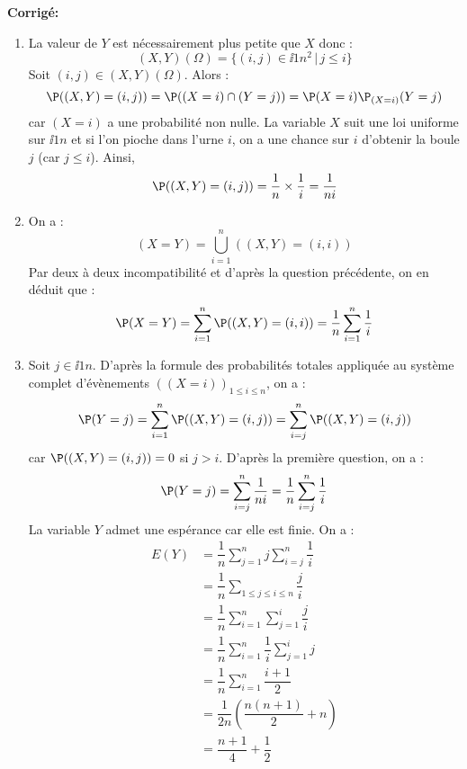 \documentclass[a4paper,twoside,french,11pt]{VcCours}
\newcommand{\corr}{\textbf{Corrigé:}}
\begin{document}
\corr

\begin{enumerate}
\item La valeur de $Y$ est nécessairement plus petite que $X$ donc :
$$ (X,Y)(\Omega) = \lbrace (i,j) \in \ii{1}{n}^2 \, \vert \, j \leq i \rbrace$$
Soit $(i,j) \in (X,Y)(\Omega)$. Alors :
$$ \P((X,Y)=(i,j)) = \P((X=i) \cap (Y=j)) = \P(X=i) \P_{(X=i)}(Y=j)$$
car $(X=i)$ a une probabilité non nulle. La variable $X$ suit une loi uniforme sur $\ii{1}{n}$ et si l'on pioche dans l'urne $i$, on a une chance sur $i$ d'obtenir la boule $j$ (car $j \leq i$). Ainsi,
$$ \P((X,Y)=(i,j)) = \dfrac{1}{n} \times \dfrac{1}{i} = \dfrac{1}{ni}$$
\item On a :
$$ (X=Y) = \bigcup_{i=1}^n ((X,Y)=(i,i))$$
Par deux à deux incompatibilité et d'après la question précédente, on en déduit que :
$$ \P(X=Y) = \sum_{i=1}^n \P((X,Y)=(i,i)) = \dfrac{1}{n} \sum_{i=1}^n \dfrac{1}{i}$$
\item Soit $j \in \ii{1}{n}$. D'après la formule des probabilités totales appliquée au système complet d'évènements $((X=i))_{1 \leq i \leq n}$, on a :
$$ \P(Y=j) = \sum_{i=1}^n \P((X,Y)=(i,j)) = \sum_{i=j}^n \P((X,Y)=(i,j))$$
car $\P((X,Y)=(i,j))=0$ si $j>i$. D'après la première question, on a :
$$ \P(Y=j) =\sum_{i=j}^n \dfrac{1}{ni} = \dfrac{1}{n} \sum_{i=j}^n \dfrac{1}{i}$$
La variable $Y$ admet une espérance car elle est finie. On a :
\begin{align*}
E(Y) & = \dfrac{1}{n} \sum_{j=1}^n j \sum_{i=j}^n \dfrac{1}{i} \\
& = \dfrac{1}{n} \sum_{1 \leq j \leq i \leq n} \dfrac{j}{i} \\ 
& = \dfrac{1}{n} \sum_{i=1}^n \sum_{j=1}^i \dfrac{j}{i} \\
& = \dfrac{1}{n} \sum_{i=1}^n  \dfrac{1}{i} \sum_{j=1}^i  j \\
& =  \dfrac{1}{n} \sum_{i=1}^n \dfrac{i+1}{2} \\
& = \dfrac{1}{2n} \left(  \dfrac{n(n+1)}{2} + n \right)\\
& = \dfrac{n+1}{4} + \dfrac{1}{2}
\end{align*}
\end{enumerate}
\end{document}
